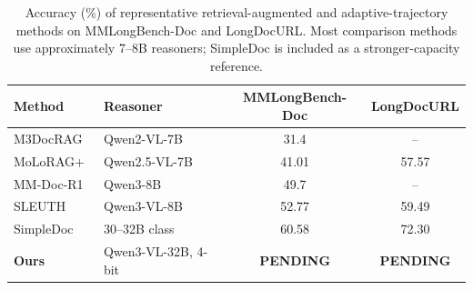 \begin{table}[ht]
\centering
\small
\setlength{\tabcolsep}{4.5pt}
\begin{tabular}{llcc}
\toprule
\textbf{Method} & \textbf{Reasoner} & \textbf{MMLongBench-Doc} & \textbf{LongDocURL} \\
\midrule
M3DocRAG~\cite{cho2024m3docrag}
    & Qwen2-VL-7B & 31.4 & -- \\

MoLoRAG+~\cite{wu2025molorag}
    & Qwen2.5-VL-7B & 41.01 & 57.57 \\

MM-Doc-R1~\cite{lin2026mm}
    & Qwen3-8B & 49.7 & -- \\

SLEUTH~\cite{liu2025resolving}
    & Qwen3-VL-8B & 52.77 & 59.49 \\

\midrule
SimpleDoc~\cite{jain2025simpledoc}
    & 30--32B class & 60.58 & 72.30 \\

\midrule
\textbf{Ours}
    & Qwen3-VL-32B, 4-bit & \textbf{PENDING} & \textbf{PENDING} \\
\bottomrule
\end{tabular}
\caption[Accuracy of representative methods compared to ours]{Accuracy (\%) of representative retrieval-augmented and adaptive-trajectory methods on MMLongBench-Doc and LongDocURL. Most comparison methods use approximately 7--8B reasoners; SimpleDoc is included as a stronger-capacity reference.}
\label{tab:adaptive_trajectory_comparison}
\end{table}